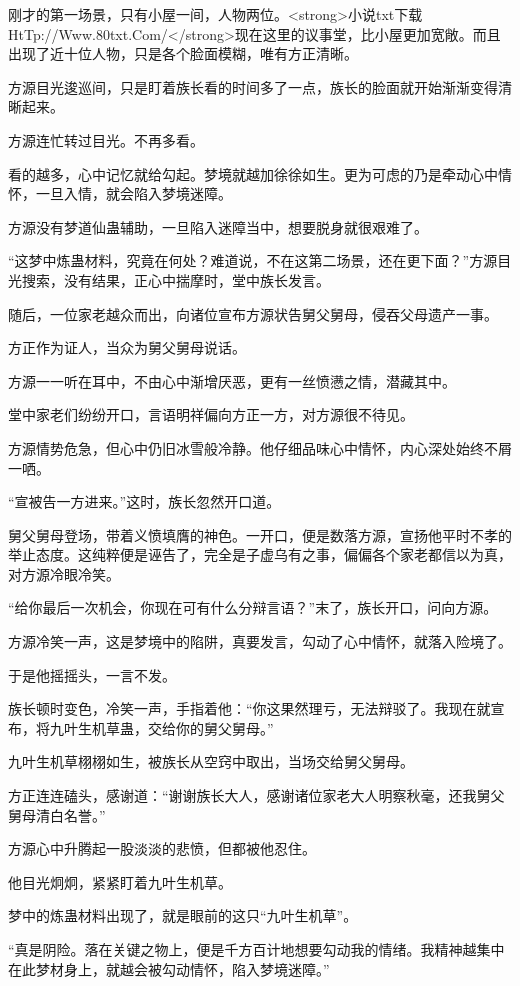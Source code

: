 \begin{this_body}
刚才的第一场景，只有小屋一间，人物两位。<strong>小说txt下载HtTp://Www.80txt.Com/</strong>现在这里的议事堂，比小屋更加宽敞。而且出现了近十位人物，只是各个脸面模糊，唯有方正清晰。

方源目光逡巡间，只是盯着族长看的时间多了一点，族长的脸面就开始渐渐变得清晰起来。

方源连忙转过目光。不再多看。

看的越多，心中记忆就给勾起。梦境就越加徐徐如生。更为可虑的乃是牵动心中情怀，一旦入情，就会陷入梦境迷障。

方源没有梦道仙蛊辅助，一旦陷入迷障当中，想要脱身就很艰难了。

“这梦中炼蛊材料，究竟在何处？难道说，不在这第二场景，还在更下面？”方源目光搜索，没有结果，正心中揣摩时，堂中族长发言。

随后，一位家老越众而出，向诸位宣布方源状告舅父舅母，侵吞父母遗产一事。

方正作为证人，当众为舅父舅母说话。

方源一一听在耳中，不由心中渐增厌恶，更有一丝愤懑之情，潜藏其中。

堂中家老们纷纷开口，言语明祥偏向方正一方，对方源很不待见。

方源情势危急，但心中仍旧冰雪般冷静。他仔细品味心中情怀，内心深处始终不屑一哂。

“宣被告一方进来。”这时，族长忽然开口道。

舅父舅母登场，带着义愤填膺的神色。一开口，便是数落方源，宣扬他平时不孝的举止态度。这纯粹便是诬告了，完全是子虚乌有之事，偏偏各个家老都信以为真，对方源冷眼冷笑。

“给你最后一次机会，你现在可有什么分辩言语？”末了，族长开口，问向方源。

方源冷笑一声，这是梦境中的陷阱，真要发言，勾动了心中情怀，就落入险境了。

于是他摇摇头，一言不发。

族长顿时变色，冷笑一声，手指着他：“你这果然理亏，无法辩驳了。我现在就宣布，将九叶生机草蛊，交给你的舅父舅母。”

九叶生机草栩栩如生，被族长从空窍中取出，当场交给舅父舅母。

方正连连磕头，感谢道：“谢谢族长大人，感谢诸位家老大人明察秋毫，还我舅父舅母清白名誉。”

方源心中升腾起一股淡淡的悲愤，但都被他忍住。

他目光炯炯，紧紧盯着九叶生机草。

梦中的炼蛊材料出现了，就是眼前的这只“九叶生机草”。

“真是阴险。落在关键之物上，便是千方百计地想要勾动我的情绪。我精神越集中在此梦材身上，就越会被勾动情怀，陷入梦境迷障。”


\end{this_body}
